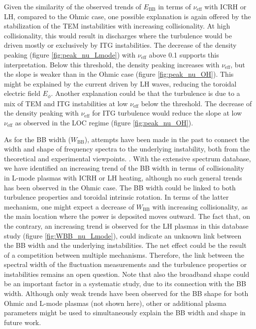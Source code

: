 Given the similarity of the observed trends of $E_\mathrm{BB}$ in terms of $\nu_\mathrm{eff}$ with ICRH or LH, compared to the Ohmic case, one possible explanation is again offered by the stabilization of the TEM instabilities with increasing collisionality. At high collisionality, this would result in discharges where the turbulence would be driven mostly or exclusively by ITG instabilities. The decrease of the density peaking (figure \ref{fig:peak_nu_Lmode}) with $\nu_\mathrm{eff}$ above 0.1 supports this interpretation. Below this threshold, the density peaking increases with $\nu_\mathrm{eff}$, but the slope is weaker than in the Ohmic case (figure \ref{fig:peak_nu_OH}). This might be explained by the current driven by LH waves, reducing the toroidal electric field $E_{\phi}$. Another explanation could be that the turbulence is due to a mix of TEM and ITG instabilities at low $\nu_\mathrm{eff}$ below the threshold. The decrease of the density peaking with $\nu_\mathrm{eff}$ for ITG turbulence would reduce the slope at low $\nu_\mathrm{eff}$ as observed in the LOC regime (figure \ref{fig:peak_nu_OH}).

As for the BB width ($W_\mathrm{BB}$), attempts have been made in the past to connect the width and shape of frequency spectra to the underlying instability, both from the theoretical and experimental viewpoints. \cite{Romanelli_1989_PoF,Mattor_1992_PoF,Watts_1996_PoP}. With the extensive spectrum database, we have identified an increasing trend of the BB width in terms of collisionality in L-mode plasmas with ICRH or LH heating, although no such general trends has been observed in the Ohmic case. The BB width could be linked to both turbulence properties and toroidal intrinsic rotation. In terms of the latter mechanism, one might expect a decrease of $W_\mathrm{BB}$ with increasing collisionality, as the main location where the power is deposited moves outward. The fact that, on the contrary, an increasing trend is observed for the LH plasmas in this database study (figure \ref{fig:WBB_nu_Lmode}), could indicate an unknown link between the BB width and the underlying instabilities. The net effect could be the result of a competition between multiple mechanisms. Therefore, the link between the spectral width of the fluctuation measurements and the turbulence properties or instabilities remains an open question. Note that also the broadband shape could be an important factor in a systematic study, due to its connection with the BB width. Although only weak trends have been observed for the BB shape for both Ohmic and L-mode plasmas (not shown here), other or additional plasma parameters might be used to simultaneously explain the BB width and shape in future work.



